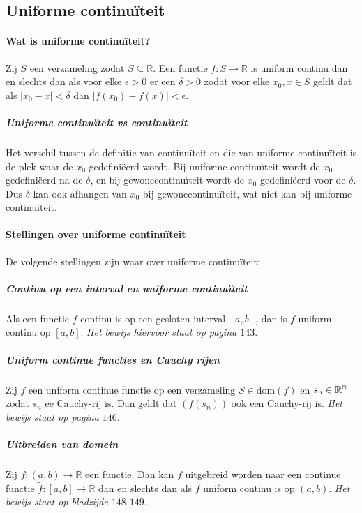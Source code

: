 \subsection{Uniforme continuïteit}

\paragraph{Wat is uniforme continuïteit?} Zij $S$ een verzameling zodat $S\subseteq\mathbb{R}$. Een functie $f:S\to\mathbb{R}$ is uniform continu dan en slechts dan als voor elke $\epsilon>0$ er een $\delta>0$ zodat voor elke $x_{0},x \in S$ geldt dat als $|x_{0}-x|<\delta$ dan $|f(x_{0})-f(x)|<\epsilon$.

\subparagraph{Uniforme continuïteit vs continuïteit} Het verschil tussen de definitie van continuïteit en die van uniforme continuïteit is de plek waar de $x_{0}$ gedefiniëerd wordt. Bij uniforme continuïteit wordt de $x_{0}$ gedefiniëerd na de $\delta$, en bij \bq gewone\eq continuïteit wordt de $x_{0}$ gedefiniëerd voor de $\delta$. Dus $\delta$ kan ook afhangen van $x_{0}$ bij \bq gewone\eq continuïteit, wat niet kan bij uniforme continuïteit.

\paragraph{Stellingen over uniforme continuïteit} De volgende stellingen zijn waar over uniforme continuïteit:

\subparagraph{Continu op een interval en uniforme continuïteit} Als een functie $f$ continu is op een gesloten interval $[a,b]$, dan is $f$ uniform continu op $[a,b]$. \textit{Het bewijs hiervoor staat op pagina $143$}.

\subparagraph{Uniform continue functies en Cauchy rijen} Zij $f$ een uniform continue functie op een verzameling $S\in\text{dom}(f)$ en $s_{n}\in\mathbb{R}^{\mathbb{N}}$ zodat $s_{n}$ ee Cauchy-rij is. Dan geldt dat $(f(s_{n}))$ ook een Cauchy-rij is. \textit{Het bewijs staat op pagina $146$}.

\subparagraph{Uitbreiden van domein} Zij $f:(a,b)\to\mathbb{R}$ een functie. Dan kan $f$ uitgebreid worden naar een continue functie $\widetilde{f}:[a,b]\to\mathbb{R}$ dan en slechts dan als $f$ uniform continu is op $(a,b)$. \textit{Het bewijs staat op bladzijde $148$-$149$}.
